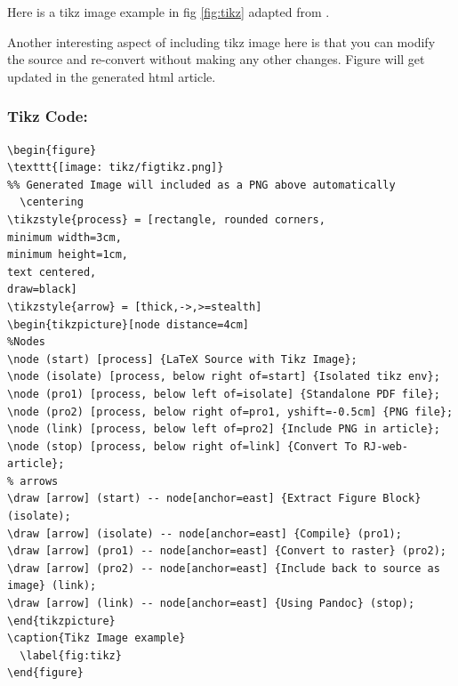 Here is a tikz image example in fig \ref{fig:tikz} adapted from \citet{tikzflow}.

Another interesting aspect of including tikz image here is that you can modify the
source and re-convert without making any other changes. Figure will get updated
in the generated html article.

\subsubsection{Tikz Code:}
\begin{verbatim}
\begin{figure}
\texttt{[image: tikz/figtikz.png]}
%% Generated Image will included as a PNG above automatically
  \centering
\tikzstyle{process} = [rectangle, rounded corners,
minimum width=3cm, 
minimum height=1cm,
text centered, 
draw=black]
\tikzstyle{arrow} = [thick,->,>=stealth]
\begin{tikzpicture}[node distance=4cm]
%Nodes
\node (start) [process] {LaTeX Source with Tikz Image};
\node (isolate) [process, below right of=start] {Isolated tikz env};
\node (pro1) [process, below left of=isolate] {Standalone PDF file};
\node (pro2) [process, below right of=pro1, yshift=-0.5cm] {PNG file};
\node (link) [process, below left of=pro2] {Include PNG in article};
\node (stop) [process, below right of=link] {Convert To RJ-web-article};
% arrows
\draw [arrow] (start) -- node[anchor=east] {Extract Figure Block} (isolate);
\draw [arrow] (isolate) -- node[anchor=east] {Compile} (pro1);
\draw [arrow] (pro1) -- node[anchor=east] {Convert to raster} (pro2);
\draw [arrow] (pro2) -- node[anchor=east] {Include back to source as image} (link);
\draw [arrow] (link) -- node[anchor=east] {Using Pandoc} (stop);
\end{tikzpicture}
\caption{Tikz Image example}
  \label{fig:tikz}
\end{figure}

\end{verbatim}


